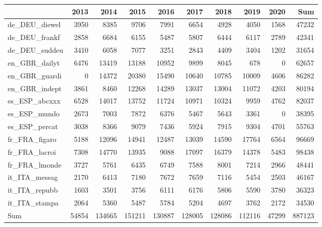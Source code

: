 \documentclass[
]{article}
\begin{document}
\begin{tabular}{l|r|r|r|r|r|r|r|r|r}
\hline
  & 2013 & 2014 & 2015 & 2016 & 2017 & 2018 & 2019 & 2020 & Sum\\
\hline
de\_DEU\_diewel & 3950 & 8385 & 9706 & 7991 & 6654 & 4928 & 4050 & 1568 & 47232\\
\hline
de\_DEU\_frankf & 2858 & 6684 & 6155 & 5487 & 5807 & 6444 & 6117 & 2789 & 42341\\
\hline
de\_DEU\_suddeu & 3410 & 6058 & 7077 & 3251 & 2843 & 4409 & 3404 & 1202 & 31654\\
\hline
en\_GBR\_dailyt & 6476 & 13419 & 13188 & 10952 & 9899 & 8045 & 678 & 0 & 62657\\
\hline
en\_GBR\_guardi & 0 & 14372 & 20380 & 15490 & 10640 & 10785 & 10009 & 4606 & 86282\\
\hline
en\_GBR\_indept & 3861 & 8460 & 12268 & 14289 & 13037 & 13004 & 11072 & 4203 & 80194\\
\hline
es\_ESP\_abcxxx & 6528 & 14017 & 13752 & 11724 & 10971 & 10324 & 9959 & 4762 & 82037\\
\hline
es\_ESP\_mundo & 2673 & 7003 & 7872 & 6376 & 5467 & 5643 & 3361 & 0 & 38395\\
\hline
es\_ESP\_percat & 3038 & 8366 & 9079 & 7436 & 5924 & 7915 & 9304 & 4701 & 55763\\
\hline
fr\_FRA\_figaro & 5188 & 12096 & 14941 & 12487 & 13039 & 14590 & 17764 & 6564 & 96669\\
\hline
fr\_FRA\_lacroi & 7308 & 14770 & 13935 & 9088 & 17097 & 16379 & 14378 & 5483 & 98438\\
\hline
fr\_FRA\_lmonde & 3727 & 5761 & 6435 & 6749 & 7588 & 8001 & 7214 & 2966 & 48441\\
\hline
it\_ITA\_messag & 2170 & 6413 & 7180 & 7672 & 7659 & 7116 & 5454 & 2503 & 46167\\
\hline
it\_ITA\_repubb & 1603 & 3501 & 3756 & 6111 & 6176 & 5806 & 5590 & 3780 & 36323\\
\hline
it\_ITA\_stampa & 2064 & 5360 & 5487 & 5784 & 5204 & 4697 & 3762 & 2172 & 34530\\
\hline
Sum & 54854 & 134665 & 151211 & 130887 & 128005 & 128086 & 112116 & 47299 & 887123\\
\hline
\end{tabular}
\end{document}
